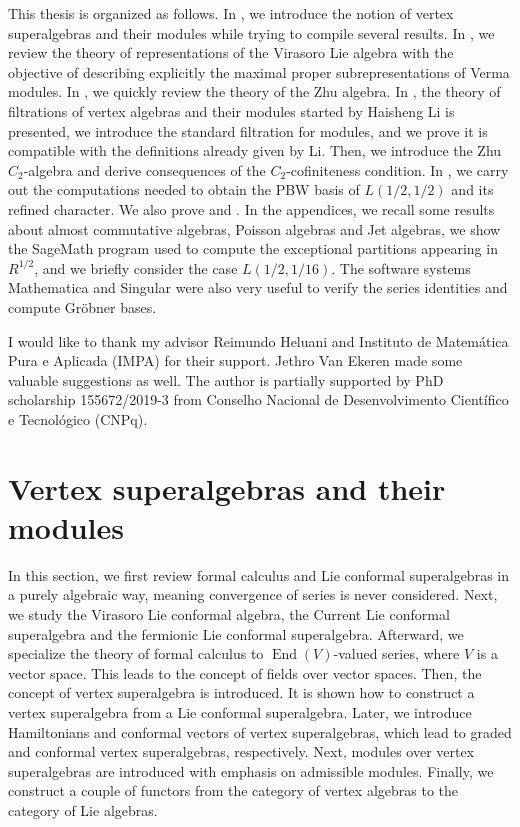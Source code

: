 \documentclass[a4paper, 12pt, reqno]{amsart}
\theoremstyle{remark}
\DeclareMathOperator{\End}{End}
\begin{document}
This thesis is organized as follows.
In , we introduce the notion of vertex superalgebras and their modules while trying to compile several results.
In , we review the theory of representations of the Virasoro Lie algebra with the objective of describing explicitly the maximal proper subrepresentations of Verma modules.
In , we quickly review the theory of the Zhu algebra.
In , the theory of filtrations of vertex algebras and their modules started by Haisheng Li is presented, we introduce the standard filtration for modules, and we prove it is compatible with the definitions already given by Li.
Then, we introduce the Zhu $C_2$-algebra and derive consequences of the $C_2$-cofiniteness condition.
In , we carry out the computations needed to obtain the PBW basis of $L(1/2, 1/2)$ and its refined character.
We also prove  and .
In the appendices, we recall some results about almost commutative algebras, Poisson algebras and Jet algebras, we show the SageMath \cite{sagemath} program used to compute the exceptional partitions appearing in $R^{1/2}$, and we briefly consider the case $L(1/2, 1/16)$.
The software systems Mathematica \cite{Mathematica} and Singular \cite{Singular} were also very useful to verify the series identities and compute Gröbner bases.

I would like to thank my advisor Reimundo Heluani and Instituto de Matemática Pura e Aplicada (IMPA) for their support.
Jethro Van Ekeren made some valuable suggestions as well.
The author is partially supported by PhD scholarship 155672/2019-3 from Conselho Nacional de Desenvolvimento Científico e Tecnológico (CNPq).


\section{Vertex superalgebras and their modules}
\label{sec:vert-supera-their}

In this section, we first review formal calculus and Lie conformal superalgebras in a purely algebraic way, meaning convergence of series is never considered.
Next, we study the Virasoro Lie conformal algebra, the Current Lie conformal superalgebra and the fermionic Lie conformal superalgebra.
Afterward, we specialize the theory of formal calculus to $\End(V)$-valued series, where $V$ is a vector space.
This leads to the concept of fields over vector spaces.
Then, the concept of vertex superalgebra is introduced.
It is shown how to construct a vertex superalgebra from a Lie conformal superalgebra.
Later, we introduce Hamiltonians and conformal vectors of vertex superalgebras, which lead to graded and conformal vertex superalgebras, respectively.
Next, modules over vertex superalgebras are introduced with emphasis on admissible modules.
Finally, we construct a couple of functors from the category of vertex algebras to the category of Lie algebras.
\end{document}
